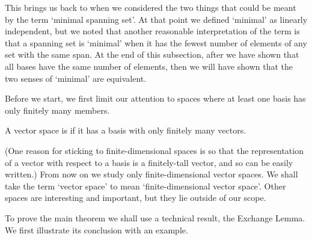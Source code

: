 This brings us back to when we considered the two things that could be meant
by the term `minimal spanning set'.
At that point we defined `minimal' as linearly independent,
but we noted that 
another reasonable interpretation of the term is  
that a spanning set is `minimal' when it has the fewest
number of elements of any set with the same span.
At the end of this subsection, after 
we have shown that all bases have the same number of elements, then
we will have shown that the two senses of `minimal' are equivalent.

Before we start, we first
limit our attention to spaces where at least one basis has only finitely
many members.

\begin{definition}
A vector space is %
if it has a basis with only finitely many vectors.
\end{definition}

\noindent (One reason for sticking to finite-dimensional spaces is so that 
the representation of a vector with respect to a 
basis is a finitely-tall vector, and so can be easily written.)
From now on we study only finite-dimensional vector spaces.
We shall take the term `vector space' to mean 
`finite-dimensional vector space'.
Other spaces are interesting and important, but they lie outside
of our scope.

To prove the main theorem we shall use a technical result, the Exchange Lemma.
We first illustrate its conclusion with an example.


